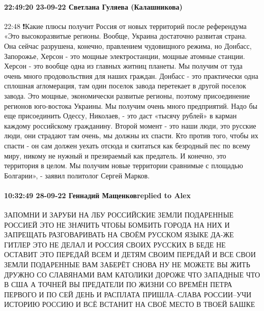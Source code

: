 \paragraph{22:49:20 23-09-22 Светлана Гуляева (Калашникова)}
22:48
❗️Какие плюсы получит Россия от новых территорий после референдума
«Это высокоразвитые регионы. Вообще, Украина достаточно развитая страна. Она сейчас разрушена, конечно, правлением чудовищного режима, но Донбасс, Запорожье, Херсон - это мощные электростанции, мощные атомные станции. Херсон - это вообще одна из главных житниц планеты. Мы получим от туда очень много продовольствия для наших граждан.
Донбасс - это практически одна сплошная агломерация, там один поселок завода перетекает в другой поселок завода. Это мощные, экономически развитые регионы, поэтому присоединение регионов юго-востока Украины. Мы получим очень много предприятий. Надо бы еще присоединить Одессу, Николаев, - это даст «тысячу рублей» в карман каждому российскому гражданину.
Второй момент - это наши люди, это русские люди, они страдают там очень, мы должны их спасти. Кто против того, чтобы их спасти - он сам должен уехать отсюда и скитаться как безродный пес по всему миру, никому не нужный и презираемый как предатель.
И конечно, это территория в целом. Мы получим новые территории сравнимые с площадью Болгарии», - заявил политолог Сергей Марков.

\paragraph{10:32:49 28-09-22 Геннадий Мащенковreplied to Alex}

ЗАПОМНИ И ЗАРУБИ НА ЛБУ РОССИЙСКИЕ ЗЕМЛИ ПОДАРЕННЫЕ РОССИЕЙ ЭТО НЕ ЗНАЧИТЬ
ЧТОБЫ БОМБИТЬ ГОРОДА НА НИХ И ЗАПРЕЩАТЬ РАЗГОВАРИВАТЬ НА СВОЁМ РУССКОМ ЯЗЫКЕ
ДА-ЖЕ ГИТЛЕР ЭТО НЕ ДЕЛАЛ И РОССИЯ СВОИХ РУССКИХ В БЕДЕ НЕ ОСТАВИТ ЭТО ПЕРЕДАЙ
ВСЕМ И ДЕТЯМ СВОИМ ПЕРЕДАЙ И ВСЕ СВОИ ЗЕМЛИ ПОДАРЕННЫЕ ВАМ ЗАБЕРЁТ СНОВА НУ НЕ
МОЖЕТЕ ВЫ ЖИТЬ ДРУЖНО СО СЛАВЯНАМИ ВАМ КАТОЛИКИ ДОРОЖЕ ЧТО ЗАПАДНЫЕ ЧТО В США А
ТОЧНЕЙ ВЫ ПРЕДАТЕЛИ ПО ЖИЗНИ СО ВРЕМЁН ПЕТРА ПЕРВОГО И ПО СЕЙ ДЕНЬ И РАСПЛАТА
ПРИШЛА--СЛАВА РОССИИ--УЧИ ИСТОРИЮ РОССИЮ И ВСЁ ВСТАНИТ НА СВОЁ МЕСТО В ТВОЕЙ
БАШКЕ

